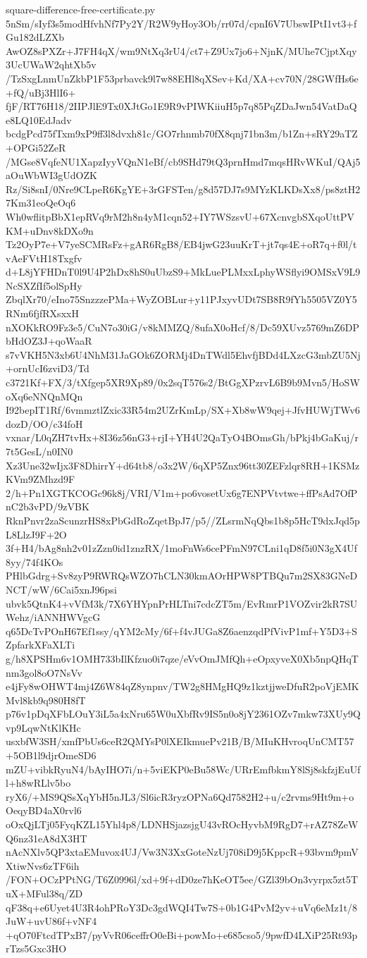 \documentclass[11pt]{article}
\theoremstyle{definition}
\theoremstyle{remark}
\begin{document}
\begin{filecontents*}[overwrite]{square-difference-free-certificate.py}
5nSm/sIyf3s5modHfvhNf7Py2Y/R2W9yHoy3Ob/rr07d/cpnI6V7UbswIPtI1vt3+fGu182dLZXb
AwOZ8sPXZr+J7FH4qX/wm9NtXq3rU4/ct7+Z9Ux7jo6+NjnK/MUhe7CjptXqy3UcUWaW2qhtXb5v
/TzSxgLnmUnZkbP1F53prbavck9l7w88EHl8qXSev+Kd/XA+cv70N/28GWfHs6e+fQ/uBj3HlI6+
fjF/RT76H18/2IIPJlE9Tx0XJtGo1E9R9vPIWKiiuH5p7q85PqZDaJwn54VatDaQe8LQ10EdJadv
bcdgPcd75fTxm9xP9ff3l8dvxh81c/GO7rhnmb70fX8qnj71bn3m/b1Zn+sRY29aTZ+OPGi52ZeR
/MGse8VqfeNU1XapzIyyVQnN1eBf/cb9SHd79tQ3prnHmd7mqsHRvWKuI/QAj5aOuWbWI3gUdOZK
Rz/Si8snI/0Nre9CLpeR6KgYE+3rGFSTen/g8d57DJ7s9MYzKLKDsXx8/ps8ztH27Km31eoQeOq6
Wh0wflitpBbX1epRVq9rM2h8n4yM1cqn52+IY7WSzsvU+67XcnvgbSXqoUttPVKM+uDnv8kDXo9n
Tz2OyP7e+V7yeSCMRsFz+gAR6RgB8/EB4jwG23uuKrT+jt7qs4E+oR7q+f0l/tvAeFVtH18Txgfv
d+L8jYFHDnT0l9U4P2hDx8hS0uUbzS9+MkLuePLMxxLphyWSflyi9OMSxV9L9NcSXZfIf5olSpHy
ZbqlXr70/eIno75SnzzzePMa+WyZOBLur+y11PJxyvUDt7SB8R9fYh5505VZ0Y5RNm6fjfRXsxxH
nXOKkRO9Fz3e5/CuN7o30iG/v8kMMZQ/8ufaX0oHcf/8/Dc59XUvz5769mZ6DPbHdOZ3J+qoWaaR
s7vVKH5N3xb6U4NhM31JaGOk6ZORMj4DnTWdl5EhvfjBDd4LXzcG3mbZU5Nj+ornUcI6zviD3/Td
c3721Kf+FX/3/tXfgep5XR9Xp89/0x2sqT576s2/BtGgXPzrvL6B9b9Mvn5/HoSWoXq6eNNQnMQn
I92bepIT1Rf/6vmmztlZxic33R54m2UZrKmLp/SX+Xb8wW9qej+JfvHUWjTWv6dozD/OO/c34foH
vxnar/L0qZH7tvHx+8I36z56nG3+rjI+YH4U2QaTyO4BOmsGh/bPkj4bGaKuj/r7t5GesL/n0IN0
Xz3Une32wIjx3F8DhirrY+d64tb8/o3x2W/6qXP5Znx96tt30ZEFzlqr8RH+1KSMzKVm9ZMhzd9F
2/h+Pn1XGTKCOGc96k8j/VRI/V1m+po6vosetUx6g7ENPVtvtwe+ffPsAd7OfPnC2b3vPD/9zVBK
RknPnvr2zaScunzrHS8xPbGdRoZqetBpJ7/p5//ZLsrmNqQbs1b8p5HcT9dxJqd5pL8LlzJ9F+2O
3f+H4/bAg8nh2v01zZzn0id1znzRX/1moFnWs6cePFmN97CLni1qD8f5i0N3gX4Uf8yy/74f4KOs
PHlbGdrg+Sv8zyP9RWRQsWZO7hCLN30kmAOrHPW8PTBQu7m2SX83GNeDNCT/wW/6Cai5xnJ96psi
ubvk5QtnK4+vVfM3k/7X6YHYpnPrHLTni7cdcZT5m/EvRmrP1VOZvir2kR7SUWehz/iANNHWVgcG
q65DcTvPOnH67Ef1ssy/qYM2cMy/6f+f4vJUGa8Z6aenzqdPfVivP1mf+Y5D3+SZpfarkXFaXLTi
g/h8XPSHm6v1OMH733bIlKfzuo0i7qze/eVvOmJMfQh+eOpxyveX0Xb5npQHqTnm3gol8oO7NsVv
e4jFy8wOHWT4mj4Z6W84qZ8ynpnv/TW2g8HMgHQ9z1kztjjweDfuR2poVjEMKMvl8kb9q980H8fT
p76v1pDqXFbLOuY3iL5a4xNru65W0uXbfRv9IS5n0o8jY2361OZv7mkw73XUy9Qvp9LqwNtKlKHc
usxbfW3SH/xmfPbUs6ceR2QMYsP0lXEIkmuePv21B/B/MIuKHvroqUnCMT57+5OB1l9djrOmeSD6
mZU+vibkRyuN4/bAyIHO7i/n+5viEKP0eBu58Wc/URrEmfbkmY8lSj8skfzjEuUfl+h8wRLlv5bo
ryX6/+MS9QSsXqYbH5nJL3/Sl6icR3ryzOPNa6Qd7582H2+u/c2rvms9Ht9m+oOeqyBD4aX0rvl6
oOxQjLTj05FyqKZL15Yhl4p8/LDNHSjazsjgU43vROcHyvbM9RgD7+rAZ78ZeWQ6nz31eA8dX3HT
nAcNXlv5QP3xtaEMuvox4UJ/Vw3N3XxGoteNzUj708iD9j5KppcR+93bvm9pmVXtiwNvs6zTF6ih
/FON+OCzPPtNG/T6Z0996l/xd+9f+dD0ze7hKeOT5ee/GZl39bOn3vyrpx5zt5TuX+MFul38q/ZD
qF38q+e6Uyet4U3R4ohPRoY3Dc3gdWQI4Tw7S+0b1G4PvM2yv+uVq6eMz1t/8JuW+uvU86f+vNF4
+qO70FtcdTPxB7/pyVvR06ceffrO0eBi+powMo+e685cso5/9pwfD4LXiP25Rt93prTzs5Gxc3HO

\end{filecontents*}
\end{document}
